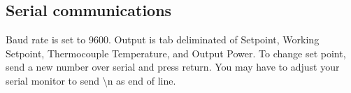 \subsection{Serial communications}\label{serial-communications}

Baud rate is set to 9600. Output is tab deliminated of Setpoint, Working
Setpoint, Thermocouple Temperature, and Output Power. To change set
point, send a new number over serial and press return. You may have to
adjust your serial monitor to send \textbackslash n as end of line.


